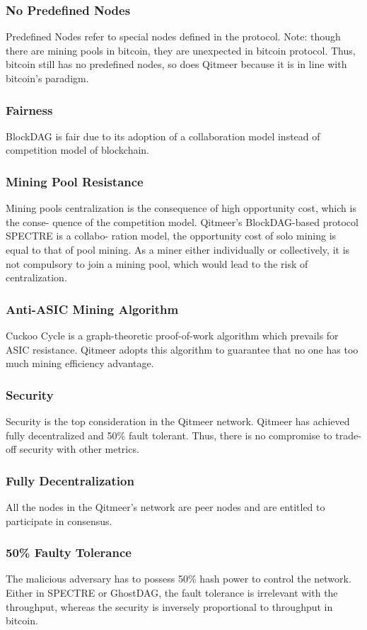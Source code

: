 \documentclass[a4paper,11pt]{article}
\begin{document}
\subsubsection*{No Predefined Nodes}
Predefined Nodes refer to special nodes defined in the protocol. Note: though there are mining pools in bitcoin,  they are unexpected in bitcoin protocol. Thus,  bitcoin still has no predefined nodes, so does Qitmeer because it is in line with bitcoin’s paradigm.
\subsubsection{Fairness}
BlockDAG is fair due to its adoption of a collaboration model instead of competition model of blockchain.
\subsubsection*{Mining Pool Resistance}
Mining pools centralization is the consequence of high opportunity cost, which is the conse- quence of the competition model. Qitmeer’s BlockDAG-based protocol SPECTRE is a collabo- ration model, the opportunity cost of solo mining is equal to that of pool mining. As a miner either individually or collectively, it is not compulsory to join a mining pool, which would lead to the risk of centralization.
\subsubsection*{Anti-ASIC Mining Algorithm}
Cuckoo Cycle is a graph-theoretic proof-of-work algorithm which prevails for ASIC resistance. Qitmeer adopts this algorithm to guarantee that no one has too much mining efficiency advantage.
\subsubsection{Security}
Security is the top consideration in the Qitmeer network. Qitmeer has achieved fully decentralized and 50\% fault tolerant. Thus, there is no compromise to trade-off security with other metrics.
\subsubsection*{Fully Decentralization}
All the nodes in the Qitmeer’s network are peer nodes and are entitled to participate in consensus.
\subsubsection*{50\% Faulty Tolerance}
The malicious adversary has to possess 50\% hash power to control the network. Either in SPECTRE or GhostDAG, the fault tolerance is irrelevant with the throughput, whereas the security is inversely proportional to throughput in bitcoin.
\end{document}
